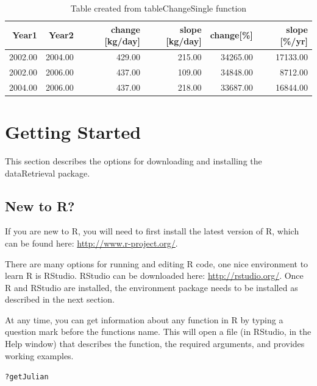 \documentclass[a4paper,11pt]{article}\usepackage{graphicx, color}
\makeatletter
\newenvironment{kframe}{%
 \def\at@end@of@kframe{}%
 \ifinner\ifhmode%
  \def\at@end@of@kframe{\end{minipage}}%
  \begin{minipage}{\columnwidth}%
 \fi\fi%
 \def\FrameCommand##1{\hskip\@totalleftmargin \hskip-\fboxsep
 \colorbox{shadecolor}{##1}\hskip-\fboxsep
     \hskip-\linewidth \hskip-\@totalleftmargin \hskip\columnwidth}%
 \MakeFramed {\advance\hsize-\width
   \@totalleftmargin\z@ \linewidth\hsize
   \@setminipage}}%
 {\par\unskip\endMakeFramed%
 \at@end@of@kframe}
\newenvironment{knitrout}{}{} %
\makeatother
\begin{document}
\begin{table}[!ht]
\begin{center}
\caption{Table created from tableChangeSingle function}
\label{table:tableChangeSingle}
\begin{tabular}{rrrrrr}
  \hline
Year1 & Year2 & change [kg/day] & slope [kg/day] & change[\%] & slope [\%/yr] \\ 
  \hline
2002.00 & 2004.00 & 429.00 & 215.00 & 34265.00 & 17133.00 \\ 
  2002.00 & 2006.00 & 437.00 & 109.00 & 34848.00 & 8712.00 \\ 
  2004.00 & 2006.00 & 437.00 & 218.00 & 33687.00 & 16844.00 \\ 
   \hline
\end{tabular}
\end{center}
\end{table}

\clearpage

\FloatBarrier
\appendix
\section{Getting Started}
\label{sec:appendix1}
This section describes the options for downloading and installing the dataRetrieval package.

\subsection{New to R?}
If you are new to R, you will need to first install the latest version of R, which can be found here: \url{http://www.r-project.org/}.

There are many options for running and editing R code, one nice environment to learn R is RStudio. RStudio can be downloaded here: \url{http://rstudio.org/}. Once R and RStudio are installed, the environment package needs to be installed as described in the next section.

At any time, you can get information about any function in R by typing a question mark before the functions name.  This will open a file (in RStudio, in the Help window) that describes the function, the required arguments, and provides working examples.

\begin{knitrout}
\color{fgcolor}\begin{kframe}
\begin{alltt}
?getJulian
\end{alltt}
\end{kframe}
\end{knitrout}
\end{document}
